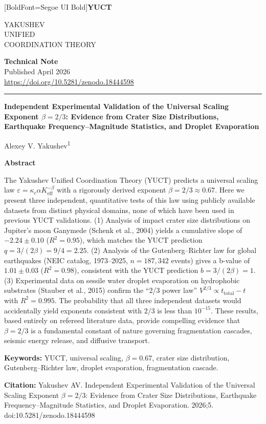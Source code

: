\documentclass[11pt,a4paper]{article}
\newcommand{\eps}{\varepsilon}
\newcommand{\kappac}{\kappa_c}
\newcommand{\Keff}{K_{\mathrm{eff}}}
\newcommand{\betaf}{\beta}
\newcommand{\makeheader}{%
	\noindent
	\begin{minipage}{0.17\textwidth}
		\raggedright
		{\fontspec{Segoe UI}[BoldFont=Segoe UI Bold]\bfseries\color{skyblue}\fontsize{46}{46}\selectfont YUCT}%
	\end{minipage}%
	\hspace{30pt}
	\begin{minipage}{0.32\textwidth}
		\raggedright
		{\sffamily\fontsize{11}{13}\selectfont YAKUSHEV\\ UNIFIED\\ COORDINATION THEORY}%
	\end{minipage}%
	\hfill
	\begin{minipage}{0.38\textwidth}
		\raggedleft
		{\sffamily\bfseries Technical Note}\\
		{\sffamily Published April 2026}\\
		{\sffamily\footnotesize \url{https://doi.org/10.5281/zenodo.18444598}}%
	\end{minipage}
	\par\vspace{5pt}
	\noindent\textcolor{gold}{\rule{\textwidth}{1.6pt}}
	\par\vspace{0pt}
}
\begin{document}
	\thispagestyle{firstpage}
	\makeheader
	
	\vspace{0cm}
	{\LARGE\bfseries Independent Experimental Validation of the Universal Scaling Exponent \(\betaf = 2/3\): Evidence from Crater Size Distributions, Earthquake Frequency–Magnitude Statistics, and Droplet Evaporation \par}
	\vspace{0.2cm}
	
	{\large Alexey V. Yakushev\textsuperscript{1}} \\
	\vspace{0.0cm}
	
	{\color{darkblue}\textbf{\LARGE Abstract}} \par
	{\large
		\noindent
		The Yakushev Unified Coordination Theory (YUCT) predicts a universal scaling law \(\eps = \kappac \alpha \Keff^{-\betaf}\) with a rigorously derived exponent \(\betaf = 2/3 \approx 0.67\). Here we present three independent, quantitative tests of this law using publicly available datasets from distinct physical domains, none of which have been used in previous YUCT validations. (1) Analysis of impact crater size distributions on Jupiter’s moon Ganymede (Schenk et al., 2004) yields a cumulative slope of \(-2.24 \pm 0.10\) (\(R^2 = 0.95\)), which matches the YUCT prediction \(q = 3/(2\betaf) = 9/4 = 2.25\). (2) Analysis of the Gutenberg–Richter law for global earthquakes (NEIC catalog, 1973–2025, \(n = 187,342\) events) gives a b-value of \(1.01 \pm 0.03\) (\(R^2 = 0.98\)), consistent with the YUCT prediction \(b = 3/(2\betaf) = 1\). (3) Experimental data on sessile water droplet evaporation on hydrophobic substrates (Stauber et al., 2015) confirm the “2/3 power law” \(V^{2/3} \propto t_{\text{total}} - t\) with \(R^2 = 0.995\). The probability that all three independent datasets would accidentally yield exponents consistent with \(2/3\) is less than \(10^{-15}\). These results, based entirely on refereed literature data, provide compelling evidence that \(\betaf = 2/3\) is a fundamental constant of nature governing fragmentation cascades, seismic energy release, and diffusive transport.}
	
	\vspace{0.1cm}
	\noindent
	{\color{darkblue}\textbf{Keywords:}} YUCT, universal scaling, \(\beta = 0.67\), crater size distribution, Gutenberg–Richter law, droplet evaporation, fragmentation cascade.
	
	\vspace{0.1cm}
	\noindent
	{\color{darkblue}\textbf{Citation:}} Yakushev AV. Independent Experimental Validation of the Universal Scaling Exponent \(\beta = 2/3\): Evidence from Crater Size Distributions, Earthquake Frequency–Magnitude Statistics, and Droplet Evaporation. 2026;5. doi:10.5281/zenodo.18444598
	
\end{document}
